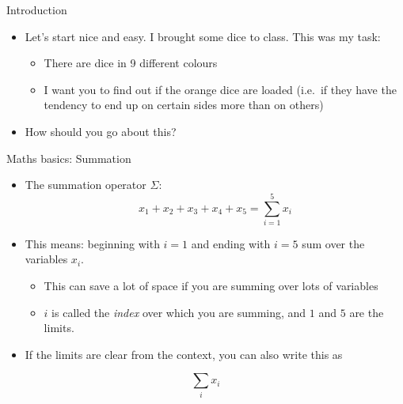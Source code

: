 \begin{frame}{Introduction}

\begin{itemize}
\itemsep1pt\parskip0pt
\item
  Let's start nice and easy. I brought some dice to class. This was my
  task:

  \begin{itemize}
  \itemsep1pt\parskip0pt
  \item
    There are dice in 9 different colours
  \item
    I want you to find out if the orange dice are loaded (i.e.~if they
    have the tendency to end up on certain sides more than on others)
  \end{itemize}
\item
  How should you go about this?
\end{itemize}

\end{frame}

\begin{frame}{Maths basics: Summation}

\begin{itemize}
\itemsep1pt\parskip0pt
\item
  The summation operator \(\Sigma\):
  \[x_1 + x_2 + x_3 + x_4 + x_5 = \sum\limits_{i=1}^5{x_i}\]
\item
  This means: beginning with \(i=1\) and ending with \(i=5\) sum over
  the variables \(x_i\).

  \begin{itemize}
  \itemsep1pt\parskip0pt
  \item
    This can save a lot of space if you are summing over lots of
    variables
  \item
    \(i\) is called the \emph{index} over which you are summing, and
    \(1\) and \(5\) are the limits.
  \end{itemize}
\item
  If the limits are clear from the context, you can also write this as
\end{itemize}

\[\sum\limits_{i}{x_i}\]

\end{frame}

